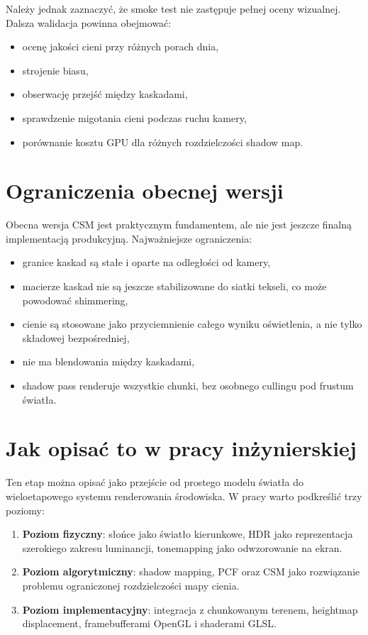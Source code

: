 \documentclass[12pt,a4paper]{article}
\begin{document}
Należy jednak zaznaczyć, że smoke test nie zastępuje pełnej oceny wizualnej. Dalsza walidacja powinna obejmować:

\begin{itemize}
    \item ocenę jakości cieni przy różnych porach dnia,
    \item strojenie biasu,
    \item obserwację przejść między kaskadami,
    \item sprawdzenie migotania cieni podczas ruchu kamery,
    \item porównanie kosztu GPU dla różnych rozdzielczości shadow map.
\end{itemize}

\section{Ograniczenia obecnej wersji}

Obecna wersja CSM jest praktycznym fundamentem, ale nie jest jeszcze finalną implementacją produkcyjną. Najważniejsze ograniczenia:

\begin{itemize}
    \item granice kaskad są stałe i oparte na odległości od kamery,
    \item macierze kaskad nie są jeszcze stabilizowane do siatki tekseli, co może powodować shimmering,
    \item cienie są stosowane jako przyciemnienie całego wyniku oświetlenia, a nie tylko składowej bezpośredniej,
    \item nie ma blendowania między kaskadami,
    \item shadow pass renderuje wszystkie chunki, bez osobnego cullingu pod frustum światła.
\end{itemize}

\section{Jak opisać to w pracy inżynierskiej}

Ten etap można opisać jako przejście od prostego modelu światła do wieloetapowego systemu renderowania środowiska. W pracy warto podkreślić trzy poziomy:

\begin{enumerate}
    \item \textbf{Poziom fizyczny}: słońce jako światło kierunkowe, HDR jako reprezentacja szerokiego zakresu luminancji, tonemapping jako odwzorowanie na ekran.
    \item \textbf{Poziom algorytmiczny}: shadow mapping, PCF oraz CSM jako rozwiązanie problemu ograniczonej rozdzielczości mapy cienia.
    \item \textbf{Poziom implementacyjny}: integracja z chunkowanym terenem, heightmap displacement, framebufferami OpenGL i shaderami GLSL.
\end{enumerate}
\end{document}
